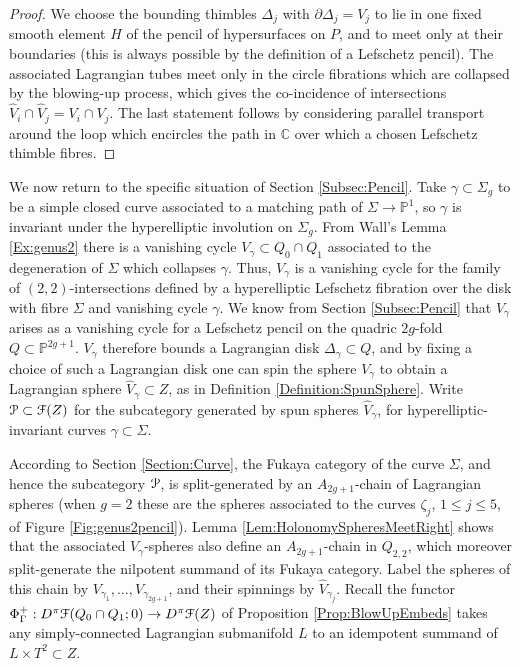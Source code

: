 \documentclass[reqno,10pt]{amsart}
\numberwithin{equation}{section}
\newcommand{\bC}{{\mathbb C}}
\newcommand{\bP}{{\mathbb P}}
\newcommand{\scrP}{\EuScript{P}}
\newcommand{\scrF}{\EuScript{F}}
\theoremstyle{remark}
\begin{document}
\begin{proof}
We choose the bounding thimbles $\Delta_j$ with $\partial \Delta_j = V_j$ to lie in one fixed smooth element $H$ of the pencil of hypersurfaces on $P$, and to meet only at their boundaries (this is always possible by the definition of a Lefschetz pencil).  The associated Lagrangian tubes   meet only in the circle fibrations which are collapsed by the blowing-up process, which gives the co-incidence of intersections $\hat{V}_i \cap \hat{V}_j = V_i\cap V_j$.  The last statement follows by considering parallel transport around the loop which encircles the path in $\bC$ over which a chosen Lefschetz thimble fibres.
\end{proof}

We now return to the specific situation of Section \ref{Subsec:Pencil}.  Take $\gamma \subset \Sigma_g$ to be a simple closed curve associated to a  matching path of $\Sigma \rightarrow \bP^1$, so $\gamma$ is invariant under the hyperelliptic involution on $\Sigma_g$. From Wall's Lemma \ref{Ex:genus2} there is a vanishing cycle $V_{\gamma} \subset Q_0 \cap Q_1$ associated to the degeneration of $\Sigma$ which collapses $\gamma$.  Thus, $V_{\gamma}$ is a vanishing cycle for the family of $(2,2)$-intersections defined by a hyperelliptic Lefschetz fibration over the disk with fibre $\Sigma$ and vanishing cycle $\gamma$.  We know from Section \ref{Subsec:Pencil}  that $V_{\gamma}$ arises as a vanishing cycle for a Lefschetz pencil on the quadric $2g$-fold $Q\subset \bP^{2g+1}$.   $V_{\gamma}$ therefore bounds a Lagrangian disk $\Delta_{\gamma} \subset Q$, and by fixing a choice of such a Lagrangian disk one can spin the sphere $V_{\gamma}$ to obtain a Lagrangian sphere $\hat{V}_{\gamma} \subset Z$, as in Definition \ref{Definition:SpunSphere}.
 Write $\scrP \subset \scrF(Z)$ for the subcategory generated by spun spheres $\hat{V}_{\gamma}$, for hyperelliptic-invariant curves $\gamma \subset \Sigma$.  
 
  According to Section \ref{Section:Curve}, the Fukaya category of the curve $\Sigma$, and hence the subcategory $\scrP$, is split-generated by an $A_{2g+1}$-chain of Lagrangian spheres (when $g=2$ these are the spheres associated to the curves $\zeta_j$, $1\leq j\leq 5$, of Figure \ref{Fig:genus2pencil}).  Lemma \ref{Lem:HolonomySpheresMeetRight} shows that the associated $V_{\gamma}$-spheres also define an $A_{2g+1}$-chain in $Q_{2,2}$, which moreover split-generate the nilpotent summand of its Fukaya category.  Label the spheres of this chain by $V_{\gamma_1},\ldots, V_{\gamma_{2g+1}}$, and their spinnings by $\hat{V}_{\gamma_j}$.   Recall the functor $\Phi^+_{\Gamma}: D^{\pi}\scrF(Q_0 \cap Q_1;0) \rightarrow D^{\pi}\scrF(Z)$ of Proposition \ref{Prop:BlowUpEmbeds}  takes any simply-connected Lagrangian submanifold $L$ to an idempotent summand of $L\times T^2 \subset Z$.  
\end{document}
